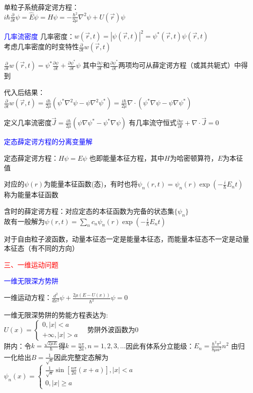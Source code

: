 \documentclass[a4paper,8pt]{extarticle} %
\newcommand{\bluetext}[1]{\textcolor{blue}{#1}}
\newcommand{\redtext}[1]{\textcolor{red}{#1}}
\begin{document}
\begin{multicols}{3}
单粒子系统薛定谔方程：\\$i\hbar\frac{\partial}{\partial t}\psi = \hat{E}\psi = H\psi = -\frac{\hbar^2}{2\mu}\nabla^2\psi + U(\vec{r})\psi$ 
 
\bluetext{几率流密度}
几率密度：$w(\vec{r}, t) = |\psi(\vec{r}, t)|^2 = \psi^*(\vec{r}, t)\psi(\vec{r}, t)$ \\ 考虑几率密度的时变特性$\frac{\partial}{\partial t}w(\vec{r}, t)$
    
    $\frac{\partial}{\partial t}w(\vec{r}, t) = \psi^*\frac{\partial\psi}{\partial t} + \frac{\partial\psi^*}{\partial t}\psi$ 其中$\frac{\partial\psi}{\partial t}$和$\frac{\partial\psi^*}{\partial t}$两项均可从薛定谔方程（或其共轭式）中得到
    
    代入后结果：\\$\frac{\partial}{\partial t}w(\vec{r}, t) = \frac{i\hbar}{2\mu}(\psi^*\nabla^2\psi - \psi\nabla^2\psi^*) = \frac{i\hbar}{2\mu}\nabla\cdot(\psi^*\nabla\psi - \psi\nabla\psi^*)$
    
    定义几率流密度$\vec{J} = \frac{i\hbar}{2\mu}(\psi\nabla\psi^* - \psi^*\nabla\psi)$ 有几率流守恒式$\frac{\partial w}{\partial t} + \nabla\cdot\vec{J} = 0$

\bluetext{定态薛定谔方程的分离变量解}

定态薛定谔方程：$H\psi = E\psi$ 也即能量本征方程，其中$H$为哈密顿算符，$E$为本征值

对应的$\psi(r)$为能量本征函数(态)，有时也将$\psi_n(r, t) = \psi_n(r)\exp(-\frac{i}{\hbar}E_n t)$称为能量本征函数

含时的薛定谔方程：对应定态的本征函数为完备的状态集$\{\psi_n\}$\\
故有一般解为$\psi(r, t) = \sum_n c_n\psi_n(r)\exp(-\frac{i}{\hbar}E_n t)$

对于自由粒子波函数，动量本征态一定是能量本征态，而能量本征态不一定是动量本征态（有不同的方向）

\redtext{三、一维运动问题}

\bluetext{一维无限深方势阱}

一维运动方程：$\frac{d^2}{dx^2}\psi + \frac{2\mu(E-U(x))}{\hbar^2}\psi = 0$

一维无限深势阱的势能方程表达为: \\
$ U(x) = \begin{cases} 
0, |x| < a \\
+\infty, |x| > a
\end{cases} \quad \text{势阱外波函数为0} $\\
阱内：令$k = \frac{\sqrt{2\mu E}}{\hbar}$得$k = \frac{n\pi}{2a}, n=1,2,3,\dots$因此有体系分立能级：$E_n = \frac{\hbar^2\pi^2}{8\mu a^2}n^2$
由归一化给出$B = \frac{1}{\sqrt{a}}$因此完整定态解为 \\
$ \psi_n(x) = \begin{cases}
\frac{1}{\sqrt{a}}\sin[\frac{n\pi}{2a}(x + a)], |x| < a \\
0, |x| \geq a
\end{cases} $


\end{multicols}
\end{document}
